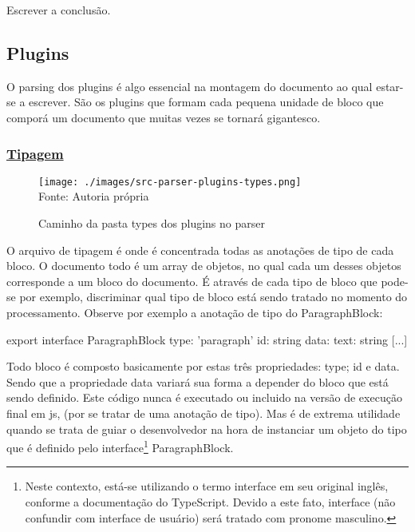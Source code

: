 Escrever a conclusão.

\subsection{Plugins}

O parsing dos plugins é algo essencial na montagem
do documento ao qual estar-se a escrever. São os plugins
que formam cada pequena unidade de bloco que comporá
um documento que muitas vezes se tornará gigantesco.

\subsubsection{\underline{Tipagem}}

\begin{figure}[H]
    \centering
    \caption{Caminho da pasta types dos plugins no parser}
    \texttt{[image: ./images/src-parser-plugins-types.png]}
    \label{fig:src-parser-plugins-types} \\
    \textnormal{\fontsize{10pt}{12pt}Fonte: Autoria própria}
\end{figure}

O arquivo de tipagem é onde é concentrada todas as anotações
de tipo de cada bloco. O documento todo é um array de objetos,
no qual cada um desses objetos corresponde a um bloco
do documento. É através de cada tipo de bloco que pode-se por exemplo,
discriminar qual tipo de bloco está sendo tratado no momento do processamento.
Observe por exemplo a anotação de tipo do ParagraphBlock:

\begin{ParagraphBlockCode}
[...]
export interface ParagraphBlock {
    type: 'paragraph'
    id: string
    data: {
        text: string
    }
}
[...]
\end{ParagraphBlockCode}

Todo bloco é composto basicamente por estas três propriedades:
type; id e data. Sendo que a propriedade data variará sua
forma a depender do bloco que está sendo definido. Este código
nunca é executado ou incluido na versão de execução final em
\acrshort{js},
(por se tratar de uma anotação de tipo). Mas é de extrema
utilidade quando se trata de guiar o desenvolvedor na hora
de instanciar um objeto do tipo que é definido pelo
interface\footnote{Neste contexto, está-se utilizando o termo interface em seu original
    inglês, conforme a documentação do TypeScript. Devido a este fato,
    interface (não confundir com interface de usuário) será tratado
    com pronome masculino.
}
ParagraphBlock.

